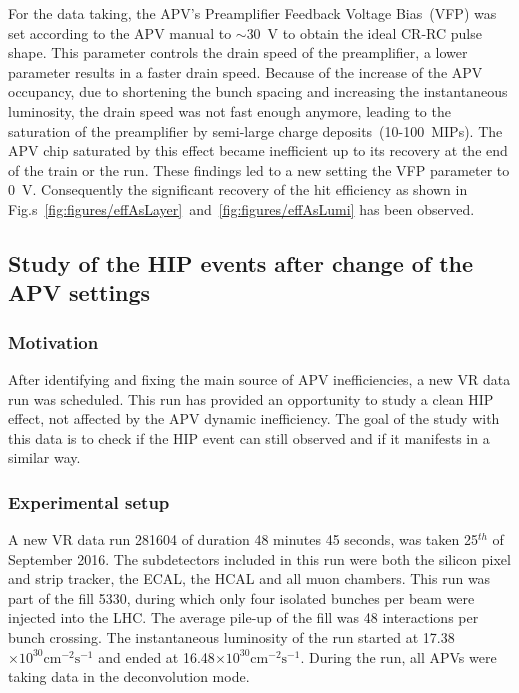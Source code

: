 For the data taking, the APV's Preamplifier Feedback Voltage Bias~(VFP) was set according to the APV manual to $\sim$30~V to obtain the ideal CR-RC pulse shape. This parameter controls the drain speed of the preamplifier, a lower parameter results in a faster drain speed. Because of the increase of the APV occupancy, due to shortening the bunch spacing and increasing the instantaneous luminosity, the drain speed was not fast enough anymore, leading to the saturation of the preamplifier by semi-large charge deposits~(10-100~MIPs). The APV chip saturated by this effect became inefficient up to its recovery at the end of the train or the run. These findings led to a new setting the VFP parameter to 0~V. Consequently the significant recovery of the hit efficiency as shown in Fig.s~\ref{fig:figures/effAsLayer}~and~\ref{fig:figures/effAsLumi} has been observed.


\subsection{Study of the HIP events after change of the APV settings}

\subsubsection{Motivation}

After identifying and fixing the main source of APV inefficiencies, a new VR data run was scheduled. This run has provided an opportunity to study a clean HIP effect, not affected by the APV dynamic inefficiency. The goal of the study with this data is to check if the HIP event can still observed and if it manifests in a similar way.


\subsubsection{Experimental setup}

A new VR data run 281604 of duration 48 minutes 45 seconds, was taken 25$^{th}$ of September 2016. The subdetectors included in this run were both the silicon pixel and strip tracker, the ECAL, the HCAL and all muon chambers. This run was part of the fill 5330, during which only four isolated bunches per beam were injected into the LHC. The average pile-up of the fill was 48 interactions per bunch crossing. The instantaneous luminosity of the run started at 17.38$\times 10^{30} \mathrm{cm^{-2} s^{-1}}$ and ended at 16.48$\times 10^{30} \mathrm{cm^{-2} s^{-1}}$. During the run, all APVs were taking data in the deconvolution mode. 

